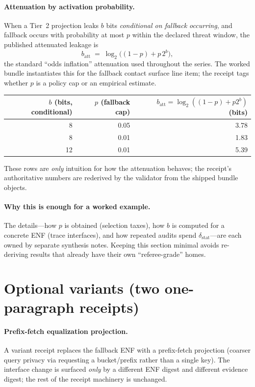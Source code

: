 \documentclass[11pt]{article}
\begin{document}
\paragraph{Attenuation by activation probability.}
When a Tier~2 projection leaks $b$ bits \emph{conditional on fallback occurring}, and fallback occurs with probability at most $p$ within the declared threat window, the published attenuated leakage is
\[
b_{\mathrm{att}} \;=\; \log_2\!\big((1-p) + p\,2^b\big),
\]
the standard ``odds inflation'' attenuation used throughout the series.\cite{series:oddsinflation,series:obsatten}
The worked bundle instantiates this for the fallback contact surface line item; the receipt tags whether $p$ is a policy cap or an empirical estimate.

\begin{center}
\small
\begin{tabular}{@{}r r r@{}}
\toprule
$b$ (bits, conditional) & $p$ (fallback cap) & $b_{\mathrm{att}}=\log_2((1-p)+p2^b)$ (bits)\\
\midrule
8 & 0.05 & 3.78\\
8 & 0.01 & 1.83\\
12 & 0.01 & 5.39\\
\bottomrule
\end{tabular}
\end{center}
\vspace{-0.5em}

\noindent These rows are \emph{only} intuition for how the attenuation behaves; the receipt’s authoritative numbers are rederived by the validator from the shipped bundle objects.

\paragraph{Why this is enough for a worked example.}
The details---how $p$ is obtained (selection taxes), how $b$ is computed for a concrete ENF (trace interfaces), and how repeated audits spend $\delta_{\mathrm{stat}}$---are each owned by separate synthesis notes.\cite{series:fallbacktax,series:traceifaces,series:stataudit,series:anytimespend}
Keeping this section minimal avoids re-deriving results that already have their own ``referee-grade'' homes.

\section{Optional variants (two one-paragraph receipts)}
\paragraph{Prefix-fetch equalization projection.}
A variant receipt replaces the fallback ENF with a prefix-fetch projection (coarser query privacy via requesting a bucket/prefix rather than a single key).
The interface change is surfaced \emph{only} by a different ENF digest and different evidence digest; the rest of the receipt machinery is unchanged.\cite{series:prefixcapacities,series:stataudit}
\end{document}
